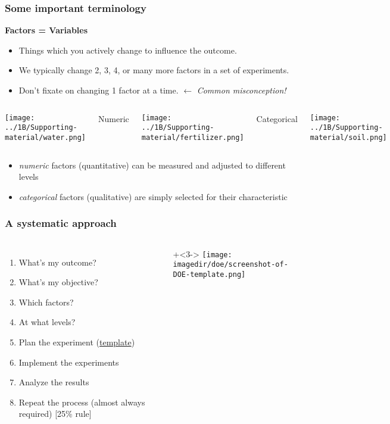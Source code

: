 \documentclass[11pt,aspectratio=169,mathserif]{beamer}
\begin{document}
\begin{frame}\frametitle{Some important terminology}
	\vspace{12pt}
	\textbf{{\color{purple} Factors = Variables}}
		\begin{itemize}
			\item	Things which you actively change to influence the outcome.
			\item	We typically change 2, 3, 4, or many more factors in a set of experiments. \pause
			\item	Don't fixate on changing 1 factor at a time. {\color{myOrange}  $\longleftarrow$	\emph{Common misconception!}}
		\end{itemize}
	
	\begin{columns}[T]
			\centerline{\texttt{[image: ../1B/Supporting-material/water.png]}}
			
			\centerline{Numeric}


			\centerline{\texttt{[image: ../1B/Supporting-material/fertilizer.png]}}
			
			\centerline{Categorical}


			\centerline{\texttt{[image: ../1B/Supporting-material/soil.png]}}
	\end{columns}
	
	\begin{itemize}
		\item	\emph{numeric} factors (quantitative) can be measured and adjusted to different levels
		\item	\emph{categorical} factors (qualitative) are simply selected for their characteristic
	\end{itemize}	
\end{frame}
\begin{frame}\frametitle{A systematic approach} 
	\begin{columns}[T]
			\Large
			\begin{enumerate}
			\item	What's my outcome? 
			\item	What's my objective? \pause
			\item	Which factors? 
			\item	At what levels?\pause
			\item	Plan the experiment {\small (\href{https://yint.org/template}{template})}\pause
			\item	Implement the experiments \pause
			\item	Analyze the results\pause
			\item	Repeat the process \newline (almost always required) [25\% rule]
			\end{enumerate}
			
			\onslide+<3->{
				\texttt{[image: \\imagedir/doe/screenshot-of-DOE-template.png]}
			}
	\end{columns}
\end{frame}
\end{document}
